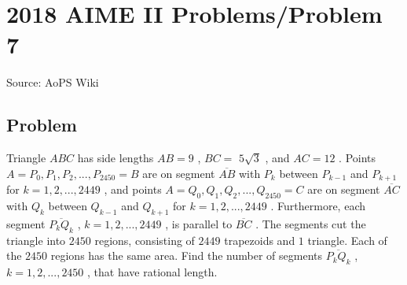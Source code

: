 \documentclass[12pt]{article}
\begin{document}
\section*{{2018 AIME II Problems/Problem 7}}
Source: AoPS Wiki

\subsection*{Problem}
Triangle $ABC$ has side lengths $AB = 9$ , $BC =$ $5\sqrt{3}$ , and $AC = 12$ . Points $A = P_{0}, P_{1}, P_{2}, ... , P_{2450} = B$ are on segment $\overline{AB}$ with $P_{k}$ between $P_{k-1}$ and $P_{k+1}$ for $k = 1, 2, ..., 2449$ , and points $A = Q_{0}, Q_{1}, Q_{2}, ... , Q_{2450} = C$ are on segment $\overline{AC}$ with $Q_{k}$ between $Q_{k-1}$ and $Q_{k+1}$ for $k = 1, 2, ..., 2449$ . Furthermore, each segment $\overline{P_{k}Q_{k}}$ , $k = 1, 2, ..., 2449$ , is parallel to $\overline{BC}$ . The segments cut the triangle into $2450$ regions, consisting of $2449$ trapezoids and $1$ triangle. Each of the $2450$ regions has the same area. Find the number of segments $\overline{P_{k}Q_{k}}$ , $k = 1, 2, ..., 2450$ , that have rational length.
\end{document}
